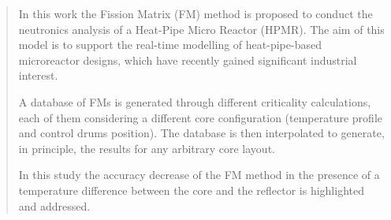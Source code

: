 \documentclass[preprint,review,12pt]{elsarticle}
\begin{document}
\begin{frontmatter}



\begin{abstract}

In this work the Fission Matrix (FM) method is proposed to conduct the neutronics analysis of a Heat-Pipe Micro Reactor (HPMR). The aim of this model is to support the real-time modelling of heat-pipe-based microreactor designs, which have recently gained significant industrial interest. 

A database of FMs is generated through different criticality calculations, each of them considering a different core configuration (temperature profile and control drums position). The database is then interpolated to generate, in principle, the results for any arbitrary core layout.

In this study the accuracy decrease of the FM method in the presence of a temperature difference between the core and the reflector is highlighted and addressed.    




\end{abstract}
\end{frontmatter}
\end{document}
